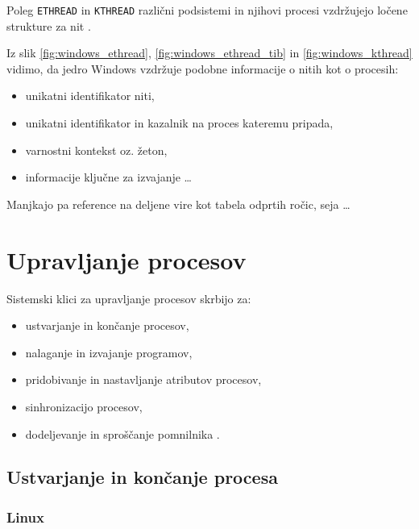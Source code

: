 \documentclass[a4paper,12pt,openright]{book}
\begin{document}
Poleg \texttt{ETHREAD} in \texttt{KTHREAD} različni podsistemi in njihovi procesi vzdržujejo ločene strukture za nit \cite{Yosifovich_Russinovich_Solomon_Ionescu_2017}.

Iz slik \ref{fig:windows_ethread}, \ref{fig:windows_ethread_tib} in \ref{fig:windows_kthread} vidimo, da jedro Windows vzdržuje podobne informacije o nitih kot o procesih:
\begin{itemize}
	\item unikatni identifikator niti,
	\item unikatni identifikator in kazalnik na proces kateremu pripada,
	\item varnostni kontekst oz. žeton,
	\item informacije ključne za izvajanje \dots
\end{itemize}
Manjkajo pa reference na deljene vire kot tabela odprtih ročic, seja \dots

\chapter{Upravljanje procesov}

Sistemski klici za upravljanje procesov skrbijo za:
\begin{itemize}
	\item ustvarjanje in končanje procesov,
	\item nalaganje in izvajanje programov,
	\item pridobivanje in nastavljanje atributov procesov,
	\item sinhronizacijo procesov,
	\item dodeljevanje in sproščanje pomnilnika \cite{Silberschatz_Galvin_Gagne_2018}.
\end{itemize}

\section{Ustvarjanje in končanje procesa}

\subsection{Linux}
\end{document}
